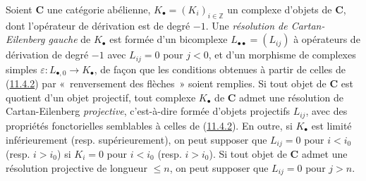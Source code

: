 \begin{env}[11.6.1]
\label{0.11.6.1-fr}
Soient $\boldsymbol{C}$ une catégorie abélienne,
$K_\bullet=(K_i)_{i\in\mathbb Z}$ un complexe d'objets de $\boldsymbol{C}$, dont
l'opérateur de dérivation est de degré $-1$. Une \emph{résolution de
Cartan-Eilenberg gauche} de $K_\bullet$ est formée d'un bicomplexe
$L_{\bullet\bullet}=(L_{ij})$ à opérateurs de dérivation de degré $-1$ avec
$L_{ij}=0$ pour $j<0$, et d'un morphisme de complexes simples
$\varepsilon:L_{\bullet,0}\to K_\bullet$, de façon que les conditions obtenues
à partir de celles de (\hyperref[0.11.4.2-fr]{11.4.2}) par «~renversement des
flèches~» soient remplies. Si tout objet de $\boldsymbol{C}$ est quotient d'un
objet projectif, tout complexe $K_\bullet$ de $\boldsymbol{C}$ admet une
résolution de Cartan-Eilenberg \emph{projective}, c'est-à-dire formée d'objets
projectifs $L_{ij}$, avec des propriétés fonctorielles semblables à celles de
(\hyperref[0.11.4.2-fr]{11.4.2}). En outre, si $K_\bullet$ est limité
inférieurement (resp. supérieurement), on peut supposer que $L_{ij}=0$ pour
$i<i_0$ (resp. $i>i_0$) si $K_i=0$ pour $i<i_0$ (resp. $i>i_0$). Si tout
objet de $\boldsymbol{C}$ admet une résolution projective de longueur $\leq n$,
on peut supposer que $L_{ij}=0$ pour $j>n$.
\end{env}

